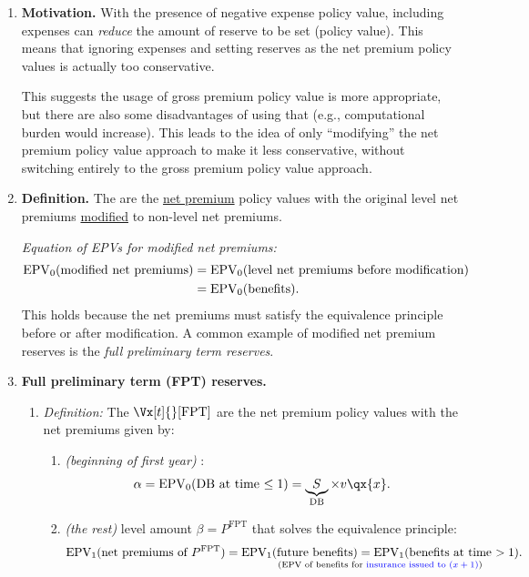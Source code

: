\begin{enumerate}
\begin{enumerate}[label={(\arabic*)}]
\begin{itemize}
Example of recursive formulas:
\[
(\Vx[t]{}[e]+P^e-e_t)(1+i)=\qx{x+t}(E_{t+1})+\px{x+t}(\Vx[t+1]{}[e]).
\]
\end{itemize}
\end{enumerate}
\subsubsection*{Theme 3: Modified net premium reserves}
\item \textbf{Motivation.} With the presence of negative expense policy value,
including expenses can \emph{reduce} the amount of reserve to be set (policy
value). This means that ignoring expenses and setting reserves as the
net premium policy values is actually too conservative.

This suggests the usage of gross premium policy value is more appropriate, but
there are also some disadvantages  of using that
(e.g., computational burden would increase). This leads to the idea of only
``modifying'' the net premium policy value approach to make it less
conservative, without switching entirely to the gross premium policy value
approach.

\item \textbf{Definition.} The  are the
\underline{net premium} policy values with the original level net premiums
\underline{modified} to non-level net premiums.

\emph{Equation of EPVs for modified net premiums:}
\begin{align*}
\operatorname{EPV}_{0}(\text{modified net premiums})
&=\operatorname{EPV}_{0}(\text{level net premiums before modification}) \\
&=\operatorname{EPV}_{0}(\text{benefits}).
\end{align*}
This holds because the net premiums must satisfy the equivalence principle
before or after modification. A common example of modified net premium reserves
is the \emph{full preliminary term reserves}.

\item \label{it:fpt-reserves} \textbf{Full preliminary term (FPT) reserves.}
\begin{enumerate}[label={(\arabic*)}]
\item \emph{Definition:} The 
\(\Vx[t]{}[\mathrm{FPT}]\) are the net premium policy values with the net
premiums given by:
\begin{enumerate}
\item \emph{(beginning of first year)} :
\[\alpha=\epvt{0}{\text{DB at time \(\le 1\)}}
=\underbrace{S}_{\mathclap{\text{DB}}}\times v\qx{x}.\]
\item \emph{(the rest)} level amount \(\beta=P^{\mathrm{FPT}}\) that solves the
equivalence principle:
\[\operatorname{EPV}_{1}(\text{net premiums of \(P^{\mathrm{FPT}}\)})
=
\underset{\text{(EPV of benefits for {\color{blue}insurance issued to \((x+1)\)})}}
{\operatorname{EPV}_{1}(\text{future benefits})
=\operatorname{EPV}_{1}(\text{benefits at time \(>1\)})}.
\]
\end{enumerate}


\end{enumerate}
\end{enumerate}
